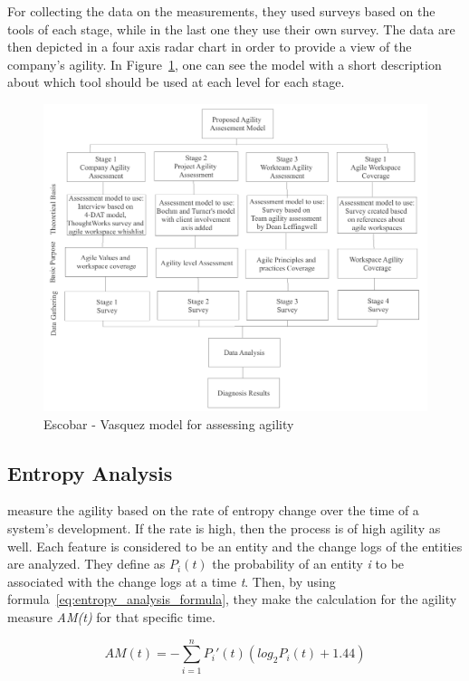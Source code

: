 For collecting the data on the measurements, they used surveys based on the tools of each stage, while in the last one they use their own survey. The data are then depicted in a four axis radar chart in order to provide a view of the company's agility. In Figure~\ref{escobar_model}, one can see the model with a short description about which tool should be used at each level for each stage.

\begin{figure} [H]
\centerline{\includegraphics[scale=0.75]{include/relatedwork/fig/escobar_model.pdf}}
\caption{Escobar - Vasquez model for assessing agility} 
\label{escobar_model}
\end{figure}

\subsection{Entropy Analysis}
\citet{entropy} measure the agility based on the rate of entropy change over the time of a system's development. If the rate is high, then the process is of high agility as well. Each feature is considered to be an entity and the change logs of the entities are analyzed. They define as $P_i(t)$  the probability of an entity \textit{i} to be associated with the change logs at a time \textit{t}. Then, by using formula~\eqref{eq:entropy_analysis_formula}, they make the calculation for the agility measure \textit{AM(t)} for that specific time.

\begin{equation} \label{eq:entropy_analysis_formula} AM(t) = - \sum_{i=1}^{n} P_i'(t) (log_2 P_i(t) + 1.44) \end{equation} 

